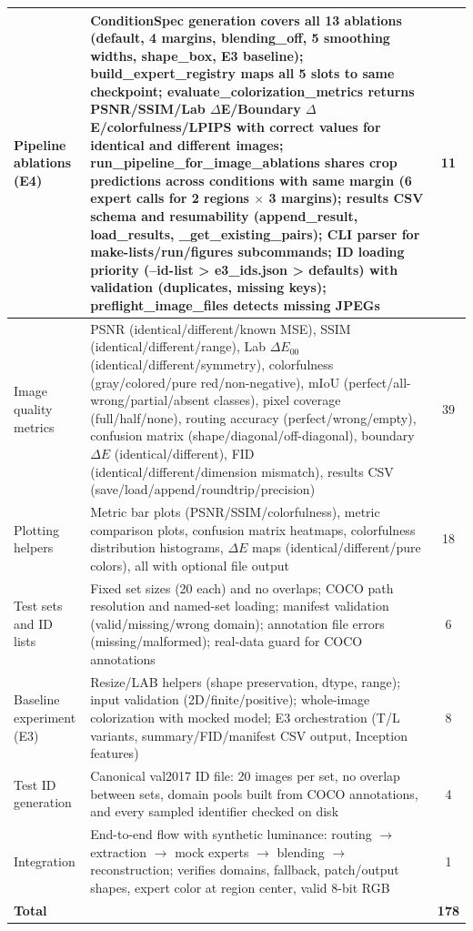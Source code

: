 \documentclass{FastFyp}
\begin{document}
\begin{longtable}{|p{3.4cm}|p{6.8cm}|c|}
Pipeline ablations (E4) & ConditionSpec generation covers all 13 ablations (default, 4 margins, blending\_off, 5 smoothing widths, shape\_box, E3 baseline); build\_expert\_registry maps all 5 slots to same checkpoint; evaluate\_colorization\_metrics returns PSNR/SSIM/Lab $\Delta$E/Boundary $\Delta$E/colorfulness/LPIPS with correct values for identical and different images; run\_pipeline\_for\_image\_ablations shares crop predictions across conditions with same margin (6 expert calls for 2 regions $\times$ 3 margins); results CSV schema and resumability (append\_result, load\_results, \_get\_existing\_pairs); CLI parser for make-lists/run/figures subcommands; ID loading priority (--id-list > e3\_ids.json > defaults) with validation (duplicates, missing keys); preflight\_image\_files detects missing JPEGs & 11 \\ \hline
Image quality metrics & PSNR (identical/different/known MSE), SSIM (identical/different/range), Lab $\Delta E_{00}$ (identical/different/symmetry), colorfulness (gray/colored/pure red/non-negative), mIoU (perfect/all-wrong/partial/absent classes), pixel coverage (full/half/none), routing accuracy (perfect/wrong/empty), confusion matrix (shape/diagonal/off-diagonal), boundary $\Delta E$ (identical/different), FID (identical/different/dimension mismatch), results CSV (save/load/append/roundtrip/precision) & 39 \\ \hline
Plotting helpers & Metric bar plots (PSNR/SSIM/colorfulness), metric comparison plots, confusion matrix heatmaps, colorfulness distribution histograms, $\Delta E$ maps (identical/different/pure colors), all with optional file output & 18 \\ \hline
Test sets and ID lists & Fixed set sizes (20 each) and no overlaps; COCO path resolution and named-set loading; manifest validation (valid/missing/wrong domain); annotation file errors (missing/malformed); real-data guard for COCO annotations & 6 \\ \hline
Baseline experiment (E3) & Resize/LAB helpers (shape preservation, dtype, range); input validation (2D/finite/positive); whole-image colorization with mocked model; E3 orchestration (T/L variants, summary/FID/manifest CSV output, Inception features) & 8 \\ \hline
Test ID generation & Canonical val2017 ID file: 20 images per set, no overlap between sets, domain pools built from COCO annotations, and every sampled identifier checked on disk & 4 \\ \hline
Integration & End-to-end flow with synthetic luminance: routing $\to$ extraction $\to$ mock experts $\to$ blending $\to$ reconstruction; verifies domains, fallback, patch/output shapes, expert color at region center, valid 8-bit RGB & 1 \\ \hline
\textbf{Total} & & \textbf{178} \\ \hline
\end{longtable}
\end{document}
